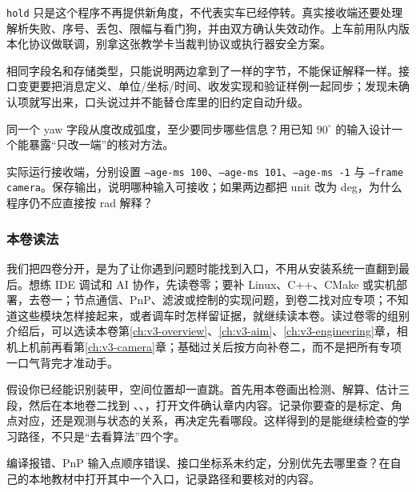 \begin{note}
\texttt{hold} 只是这个程序不再提供新角度，不代表实车已经停转。真实接收端还要处理解析失败、序号、丢包、限幅与看门狗，并由双方确认失效动作。上车前用队内版本化协议做联调，别拿这张教学卡当裁判协议或执行器安全方案。
\end{note}

\begin{conclusion}
相同字段名和存储类型，只能说明两边拿到了一样的字节，不能保证解释一样。接口变更要把消息定义、单位/坐标/时间、收发实现和验证样例一起同步；发现未确认项就写出来，口头说过并不能替仓库里的旧约定自动升级。
\end{conclusion}

\begin{exercise}
\label{v3-ex-overview-4}
同一个 yaw 字段从度改成弧度，至少要同步哪些信息？用已知 $90^\circ$ 的输入设计一个能暴露“只改一端”的核对方法。
\end{exercise}

\begin{exercise}
\label{v3-ex-overview-6}
实际运行接收端，分别设置 \texttt{--age-ms 100}、\texttt{--age-ms 101}、\texttt{--age-ms -1} 与 \texttt{--frame camera}。保存输出，说明哪种输入可接收；如果两边都把 unit 改为 deg，为什么程序仍不应直接按 rad 解释？
\end{exercise}

\subsubsection{本卷读法}

我们把四卷分开，是为了让你遇到问题时能找到入口，不用从安装系统一直翻到最后。想练 IDE 调试和 AI 协作，先读卷零；要补 Linux、C++、CMake 或实机部署，去卷一；节点通信、PnP、滤波或控制的实现问题，到卷二找对应专项；不知道这些模块怎样接起来，或者调车时怎样留证据，就继续读本卷。读过卷零的组别介绍后，可以选读本卷第\ref{ch:v3-overview}、\ref{ch:v3-aim}、\ref{ch:v3-engineering}章，相机上机前再看第\ref{ch:v3-camera}章；基础过关后按方向补卷二，而不是把所有专项一口气背完才准动手。

\begin{example}[查找下一本书]
假设你已经能识别装甲，空间位置却一直跳。首先用本卷画出检测、解算、估计三段，然后在本地卷二找到 、、，打开文件确认章内内容。记录你要查的是标定、角点对应，还是观测与状态的关系，再决定先看哪段。这样得到的是能继续检查的学习路径，不只是“去看算法”四个字。
\end{example}

\begin{exercise}
\label{v3-ex-overview-5}
编译报错、PnP 输入点顺序错误、接口坐标系未约定，分别优先去哪里查？在自己的本地教材中打开其中一个入口，记录路径和要核对的内容。
\end{exercise}
